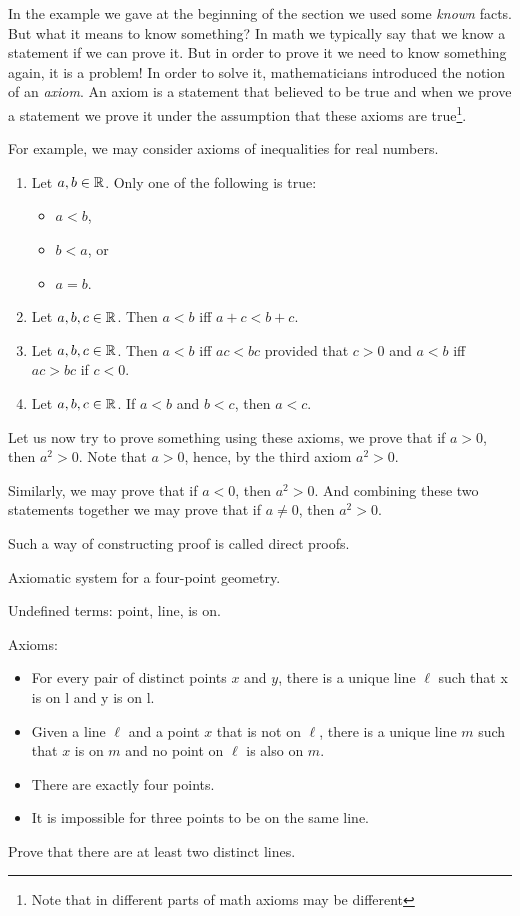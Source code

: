 In the example we gave at the beginning of the section we used some
\textit{known} facts. But what it means to know something? In math we typically
say that we know a statement if we can prove it. But in order to prove it we
need to know something again, it is a problem! In order to solve it,
mathematicians introduced the notion of an \textit{axiom}.
An axiom is a statement that believed to be true and when we prove a statement
we prove it under the assumption that these axioms are true\footnote{Note that
in different parts of math axioms may be different}.

For example, we may consider axioms of inequalities for real numbers.
\begin{enumerate}
  \item Let $a, b \in \mathbb{R}$. Only one of the following is true:
    \begin{itemize}
      \item $a < b$,
      \item $b < a$, or
      \item $a = b$.
    \end{itemize}
  \item Let $a, b, c \in \mathbb{R}$. Then $a < b$ iff $a + c < b + c$.
  \item Let $a, b, c \in \mathbb{R}$. Then $a < b$ iff $ac < bc$ provided
    that $c > 0$ and $a < b$ iff $ac > bc$ if $c < 0$.
  \item Let $a, b, c \in \mathbb{R}$. If $a < b$ and $b < c$, then $a < c$.
\end{enumerate}

Let us now try to prove something using these axioms, we prove that if $a > 0$,
then $a^2 > 0$. Note that $a > 0$, hence, by the third axiom $a^2 > 0$.

Similarly, we may prove that if $a < 0$, then $a^2 > 0$. And combining these
two statements together we may prove that if $a \neq 0$, then $a^2 > 0$.

Such a way of constructing proof is called direct proofs.

\begin{exercise}
  Axiomatic system for a four-point geometry.

  Undefined terms: point, line, is on.

  Axioms:
  \begin{itemize}
    \item For every pair of distinct points $x$ and $y$, there is a unique line
      $\ell$ such that x is on l and y is on l.
    \item Given a line $\ell$ and a point $x$ that is not on $\ell$, there is a
      unique line $m$ such that $x$ is on $m$ and no point on $\ell$ is also on
      $m$.
    \item There are exactly four points.
    \item It is impossible for three points to be on the same line.
  \end{itemize}
  Prove that there are at least two distinct lines.
\end{exercise}

